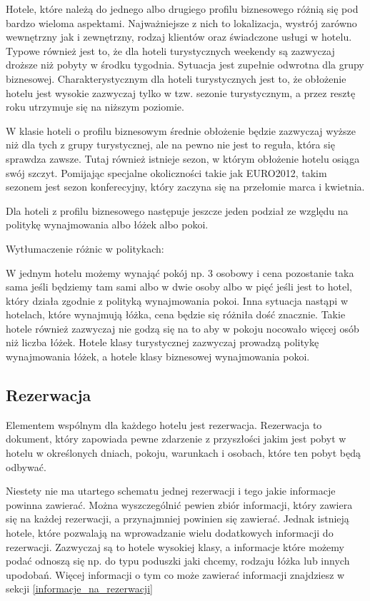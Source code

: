 \documentclass[12pt, a4paper]{article}
\begin{document}
Hotele, które należą do jednego albo drugiego profilu biznesowego różnią się pod
bardzo wieloma aspektami. Najważniejsze z nich to lokalizacja, wystrój
zarówno wewnętrzny jak i zewnętrzny, rodzaj klientów oraz świadczone usługi
w hotelu. Typowe również jest to, że dla hoteli turystycznych weekendy są zazwyczaj
 droższe niż pobyty w środku tygodnia. Sytuacja jest zupełnie odwrotna dla grupy
 biznesowej. Charakterystycznym dla hoteli turystycznych jest to, że obłożenie
 hotelu jest wysokie zazwyczaj tylko w tzw. sezonie turystycznym, a przez resztę
 roku utrzymuje się na niższym poziomie.
 
 W klasie hoteli o profilu biznesowym średnie obłożenie będzie zazwyczaj wyższe
 niż dla tych z grupy turystycznej, ale na pewno nie jest to reguła, która się
  sprawdza zawsze. Tutaj również istnieje sezon, w którym obłożenie hotelu
  osiąga swój szczyt. Pomijając specjalne okoliczności takie jak EURO2012, takim
  sezonem jest sezon konferecyjny, który zaczyna się na przełomie marca i kwietnia.
  
  Dla hoteli z profilu biznesowego następuje 
 jeszcze jeden podział ze względu na politykę wynajmowania albo łóżek albo pokoi.
   
 Wytłumaczenie różnic w politykach:
 
 W jednym hotelu możemy wynająć pokój np.
 3 osobowy i cena pozostanie taka sama jeśli będziemy tam sami albo w dwie osoby albo w pięć jeśli jest to hotel,
  który działa zgodnie z polityką wynajmowania pokoi. Inna sytuacja nastąpi w hotelach, które wynajmują łóżka,
   cena będzie się różniła dość znacznie. Takie hotele również
   zazwyczaj nie godzą się na to aby w pokoju nocowało więcej osób niż liczba łóżek. 
   Hotele klasy turystycznej zazwyczaj prowadzą politykę wynajmowania łóżek, a hotele klasy biznesowej wynajmowania pokoi.

\subsection{Rezerwacja}
Elementem wspólnym dla każdego hotelu jest rezerwacja.
Rezerwacja to dokument, który zapowiada pewne zdarzenie
z przyszłości jakim jest pobyt w hotelu w określonych dniach,
pokoju, warunkach i osobach, które ten pobyt będą odbywać.

Niestety nie ma utartego schematu jednej rezerwacji i tego jakie informacje
powinna zawierać. Można wyszczególnić pewien zbiór informacji, który zawiera się
na każdej rezerwacji, a przynajmniej powinien się zawierać. Jednak istnieją
hotele, które pozwalają na wprowadzanie wielu dodatkowych informacji do
rezerwacji. Zazwyczaj są to hotele wysokiej klasy, a informacje które możemy
podać odnoszą się np. do typu poduszki jaki chcemy, rodzaju łóżka lub innych
upodobań. Więcej informacji o tym co może zawierać informacji znajdziesz w
sekcji \ref{informacje_na_rezerwacji}
\end{document}
